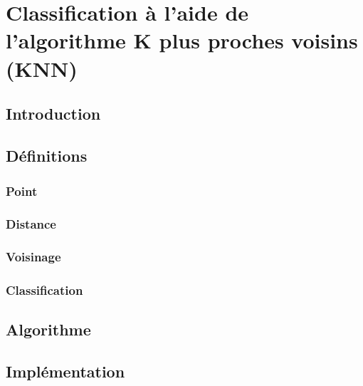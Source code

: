 \chapter{Classification à l'aide de l'algorithme K plus proches voisins (KNN)}
	\section{Introduction}
	\section{Définitions}
		\paragraph{}
		\subsection{Point}
			\paragraph{}
		\subsection{Distance}\label{transaction}
			\paragraph{}
		\subsection{Voisinage}
			\paragraph{}
		\subsection{Classification}
	
	\section{Algorithme}
		\paragraph{}
	\section{Implémentation}
